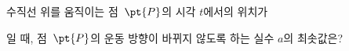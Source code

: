 수직선 위를 움직이는 점~$\pt{P}$의 시각 $t$에서의 위치가\par\smallskip{}\par\smallskip\noindent 일 때, 점~$\pt{P}$의 운동 방향이 바뀌지 않도록 하는 실수 $a$의 최솟값은?
